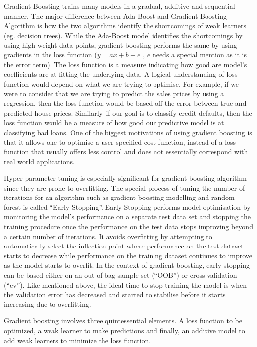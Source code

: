\documentclass[12pt]{article}
\begin{document}
Gradient Boosting trains many models in a gradual, additive and sequential manner. The major difference between Ada-Boost and Gradient Boosting Algorithm is how the two algorithms identify the shortcomings of weak learners (eg. decision trees). While the Ada-Boost model identifies the shortcomings by using high weight data points, gradient boosting performs the same by using gradients in the loss function ($y=ax+b+e$ , $e$ needs a special mention as it is the error term). The loss function is a measure indicating how good are model’s coefficients are at fitting the underlying data. A logical understanding of loss function would depend on what we are trying to optimise. For example, if we were to consider that we are trying to predict the sales prices by using a regression, then the loss function would be based off the error between true and predicted house prices. Similarly, if our goal is to classify credit defaults, then the loss function would be a measure of how good our predictive model is at classifying bad loans. One of the biggest motivations of using gradient boosting is that it allows one to optimise a user specified cost function, instead of a loss function that usually offers less control and does not essentially correspond with real world applications.

Hyper-parameter tuning is especially significant for gradient boosting algorithm since they are prone to overfitting. The special process of tuning the number of iterations for an algorithm such as gradient boosting modelling and random forest is called “Early Stopping”. Early Stopping performs model optimisation by monitoring the model’s performance on a separate test data set and stopping the training procedure once the performance on the test data stops improving beyond a certain number of iterations. It avoids overfitting by attempting to automatically select the inflection point where performance on the test dataset starts to decrease while performance on the training dataset continues to improve as the model starts to overfit. In the context of gradient boosting, early stopping can be based either on an out of bag sample set (“OOB”) or cross-validation (“cv”). Like mentioned above, the ideal time to stop training the model is when the validation error has decreased and started to stabilise before it starts increasing due to overfitting.

Gradient boosting involves three quintessential elements. A loss function to be optimized, a weak learner to make predictions and finally, an additive model to add weak learners to minimize the loss function.
\end{document}
